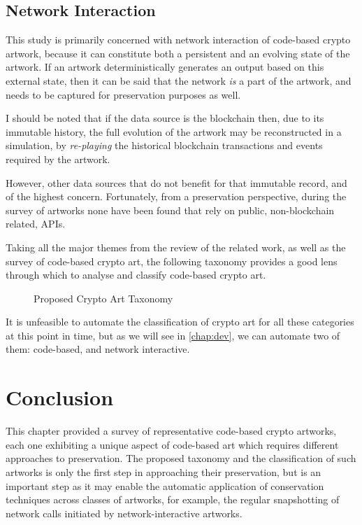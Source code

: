 \subsection{Network Interaction}

This study is primarily concerned with network interaction of code-based crypto artwork, because it can constitute both a persistent and an evolving state of the artwork. If an artwork deterministically generates an output based on this external state, then it can be said that the network \emph{is} a part of the artwork, and needs to be captured for preservation purposes as well.

I should be noted that if the data source is the blockchain then, due to its immutable history, the full evolution of the artwork may be reconstructed in a simulation, by \emph{re-playing} the historical blockchain transactions and events required by the artwork.

However, other data sources that do not benefit for that immutable record, and of the highest concern. Fortunately, from a preservation perspective,  during the survey of artworks none have been found that rely on public, non-blockchain related, APIs.

\clearpage

Taking all the major themes from the review of the related work, as well as the survey of code-based crypto art, the following taxonomy provides a good lens through which to analyse and classify code-based crypto art.

\begin{figure}[h]
    \centering
    \captionsetup{justification=centering}
    
    \caption[Proposed Crypto Art Taxonomy]{Proposed Crypto Art Taxonomy}
    \label{fig:cryptoart-taxonomy}
\end{figure}

It is unfeasible to automate the classification of crypto art for all these categories at this point in time, but as we will see in \autoref{chap:dev}, we can automate two of them: code-based, and network interactive.

\section{Conclusion}

This chapter provided a survey of representative code-based crypto artworks, each one exhibiting a unique aspect of code-based art which requires different approaches to preservation. The proposed taxonomy and the classification of such artworks is only the first step in approaching their preservation, but is an important step as it may enable the automatic application of conservation techniques across classes of artworks, for example, the regular snapshotting of network calls initiated by network-interactive artworks.